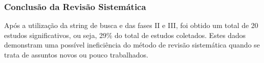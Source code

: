\subsubsection{Conclusão da Revisão Sistemática}
\quad Após a utilização da string de busca e das fases II e III, foi obtido um total de 20 estudos significativos,
ou seja, 29\% do total de estudos coletados. Estes dados demonstram uma possível ineficiência do método
de revisão sistemática quando se trata de assuntos novos ou pouco trabalhados.




